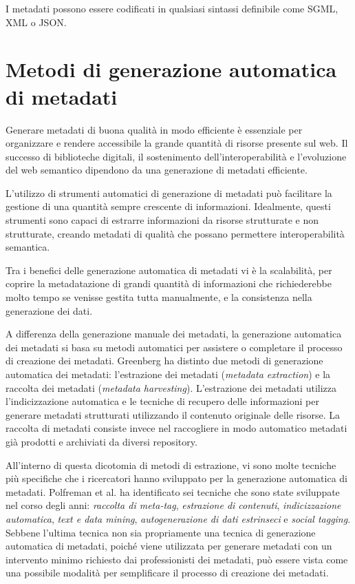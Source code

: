 I metadati possono essere codificati in qualsiasi sintassi definibile come SGML, XML o JSON.

\section{Metodi di generazione automatica di metadati}
Generare metadati di buona qualità in modo efficiente è essenziale per organizzare e rendere accessibile la grande quantità di risorse presente sul web. Il successo di biblioteche digitali, il sostenimento dell'interoperabilità e l'evoluzione del web semantico dipendono da una generazione di metadati efficiente\cite{metadata}.

\vspace{5mm}

L'utilizzo di strumenti automatici di generazione di metadati può facilitare la gestione di una quantità sempre crescente di informazioni.
Idealmente, questi strumenti sono capaci di estrarre informazioni da risorse strutturate e non strutturate, creando metadati di qualità che possano permettere interoperabilità semantica.

\vspace{5mm}

Tra i benefici delle generazione automatica di metadati vi è la scalabilità, per coprire la metadatazione di grandi quantità di informazioni che richiederebbe molto tempo se venisse gestita tutta manualmente, e la consistenza nella generazione dei dati.

A differenza della generazione manuale dei metadati, la generazione automatica dei metadati si basa su metodi automatici per assistere o completare il processo di creazione dei metadati. Greenberg ha distinto due metodi di generazione automatica dei metadati: l'estrazione dei metadati (\textit{metadata extraction}) e la raccolta dei metadati (\textit{metadata harvesting}).
L'estrazione dei metadati utilizza l'indicizzazione automatica e le tecniche di recupero delle informazioni per generare metadati strutturati utilizzando il contenuto originale delle risorse. La raccolta di metadati consiste invece nel raccogliere in modo automatico metadati già prodotti e archiviati da diversi repository.

\vspace{5mm}

All'interno di questa dicotomia di metodi di estrazione, vi sono molte tecniche più specifiche che i ricercatori hanno sviluppato per la generazione automatica di metadati. Polfreman et al. ha identificato sei tecniche che sono state sviluppate nel corso degli anni: \textit{raccolta di meta-tag}, \textit{estrazione di contenuti}, \textit{indicizzazione automatica}, \textit{text e data mining}, \textit{autogenerazione di dati estrinseci} e \textit{social tagging}. Sebbene l'ultima tecnica non sia propriamente una tecnica di generazione automatica di metadati, poiché viene utilizzata per generare metadati con un intervento minimo richiesto dai professionisti dei metadati, può essere vista come una possibile modalità per semplificare il processo di creazione dei metadati\cite{semi}.

